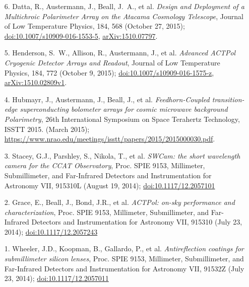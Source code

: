 \documentclass[margin,line]{res}
\begin{document}
\begin{resume}
\begin{enumerate}
\item[{6.}] Datta, R., Austermann, J., Beall, J.~A., et al. \textit{Design and
    Deployment of a Multichroic Polarimeter Array on the Atacama Cosmology
    Telescope}, Journal of Low Temperature Physics, 184, 568 (October 27, 2015);
    \href{http://dx.doi.org/10.1007/s10909-016-1553-5}{doi:10.1007/s10909-016-1553-5},
    \href{http://arxiv.org/abs/1510.07797}{arXiv:1510.07797}.
\item[{5.}] Henderson, S.~W., Allison, R., Austermann, J., et al.
    \textit{Advanced ACTPol Cryogenic Detector Arrays and Readout}, Journal of Low
    Temperature Physics, 184, 772 (October 9, 2015);
    \href{http://dx.doi.org/10.1007/s10909-016-1575-z}{doi:10.1007/s10909-016-1575-z},
    \href{http://arxiv.org/abs/1510.02809v1}{arXiv:1510.02809v1}.
\item[{4.}] Hubmayr, J., Austermann, J., Beall, J., et al. \textit{Feedhorn-Coupled
    transition-edge superconducting bolometer arrays for cosmic microwave
    background Polarimetry}, 26th International Symposium on Space Terahertz
    Technology, ISSTT 2015. (March 2015);\\
    \href{https://www.nrao.edu/meetings/isstt/papers/2015/2015000030.pdf}{https://www.nrao.edu/meetings/isstt/papers/2015/2015000030.pdf}.
\item[{3.}] Stacey, G.J., Parshley, S., Nikola, T., et al.
    \textit{SWCam: the short wavelength camera for the CCAT Observatory},
    Proc. SPIE 9153, Millimeter, Submillimeter, and Far-Infrared Detectors and Instrumentation for Astronomy VII, 
    915310L (August 19, 2014); \href{http://dx.doi.org/10.1117/12.2057101}{doi:10.1117/12.2057101}
\item[{2.}] Grace, E., Beall, J., Bond, J.R., et al.
    \textit{ACTPol: on-sky performance and characterization},
    Proc. SPIE 9153, Millimeter, Submillimeter, and Far-Infrared Detectors and Instrumentation for Astronomy VII, 
    915310 (July 23, 2014); \href{http://dx.doi.org/10.1117/12.2057243}{doi:10.1117/12.2057243}
\item[{1.}] Wheeler, J.D., Koopman, B., Gallardo, P., et al.
    \textit{Antireflection coatings for submillimeter silicon lenses},
    Proc. SPIE 9153, Millimeter, Submillimeter, and Far-Infrared Detectors and Instrumentation for Astronomy VII, 
    91532Z (July 23, 2014); \href{http://dx.doi.org/10.1117/12.2057011}{doi:10.1117/12.2057011}
\end{enumerate}


\end{resume}
\end{document}
